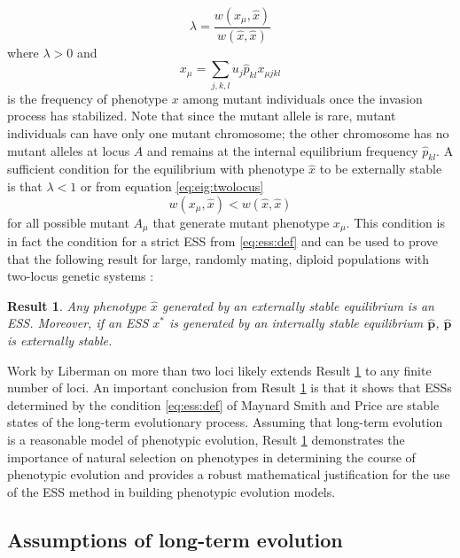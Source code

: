 \documentclass[11pt]{article}
\newcommand{\ess}[1]{#1^*}
\newcommand{\fixp}[1]{\hat{#1}}
\renewcommand{\vec}[1]{\symbf{#1}}
\newcommand{\mut}{\mu}
\newcommand{\eig}{\lambda}
\newtheorem{result}{Result}
\begin{document}
\begin{equation}
  \label{eq:eig:twolocus}
  \eig = \frac{w(x_{\mut}, \fixp{x})}{w(\fixp{x}, \fixp{x})}
\end{equation}
where $\eig>0$ and
\begin{equation}
  \label{eq:mut:pheno:twolocus}
  x_{\mut} = \sum_{j,k,l} u_{j} \fixp{p}_{kl} x_{\mut jkl}
\end{equation}
is the frequency of phenotype $x$ among mutant individuals once the invasion process has stabilized. Note that since the mutant allele is rare, mutant individuals can have only one mutant chromosome; the other chromosome has no mutant alleles at locus $A$ and remains at the internal equilibrium frequency $\fixp{p}_{kl}$. A sufficient condition for the equilibrium with phenotype $\fixp{x}$ to be externally stable is that $\eig < 1$ or from equation \eqref{eq:eig:twolocus}
\begin{equation*}
  w(x_{\mut}, \fixp{x}) < w(\fixp{x}, \fixp{x})
\end{equation*}
for all possible mutant $A_{\mut}$ that generate mutant phenotype $x_{\mut}$. This condition is in fact the condition for a strict ESS from \eqref{eq:ess:def} and can be used to prove that the following result for large, randomly mating, diploid populations with two-locus genetic systems \cite{Eshel:Feldman:1984,Eshel:1996,Eshel:Feldman:1998}:
\begin{result}
  \label{res:twolocus}
  Any phenotype $\fixp{x}$ generated by an externally stable equilibrium is an ESS. Moreover, if an ESS $\ess{x}$ is generated by an internally stable equilibrium $\fixp{\vec{p}}$, $\fixp{\vec{p}}$ is externally stable.
\end{result}
\noindent
Work by Liberman \cite{Liberman:1988} on more than two loci likely extends Result \ref{res:twolocus} to any finite number of loci. An important conclusion from Result \ref{res:twolocus} is that it shows that ESSs determined by the condition \eqref{eq:ess:def} of Maynard Smith and Price \cite{Maynard-Smith:Price:1973,Maynard-Smith:1974} are stable states of the long-term evolutionary process. Assuming that long-term evolution is a reasonable model of phenotypic evolution, Result \ref{res:twolocus} demonstrates the importance of natural selection on phenotypes in determining the course of phenotypic evolution and provides a robust mathematical justification for the use of the ESS method in building phenotypic evolution models.

\subsection{Assumptions of long-term evolution}
\end{document}
